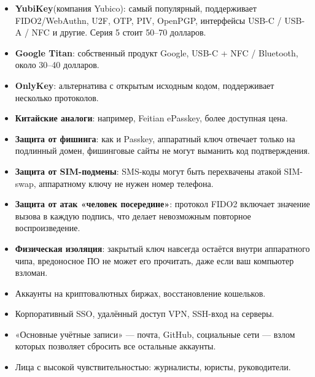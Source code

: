 \begin{itemize}
  \item \textbf{YubiKey}(компания Yubico): самый популярный, поддерживает FIDO2/WebAuthn, U2F, OTP, PIV, OpenPGP, интерфейсы USB-C / USB-A / NFC и другие. Серия 5 стоит 50–70 долларов.
  \item \textbf{Google Titan}: собственный продукт Google, USB-C + NFC / Bluetooth, около 30–40 долларов.
  \item \textbf{OnlyKey}: альтернатива с открытым исходным кодом, поддерживает несколько протоколов.
  \item \textbf{Китайские аналоги}: например, Feitian ePasskey, более доступная цена.
\end{itemize}


\begin{itemize}
  \item \textbf{Защита от фишинга}: как и Passkey, аппаратный ключ отвечает только на подлинный домен, фишинговые сайты не могут выманить код подтверждения.
  \item \textbf{Защита от SIM-подмены}: SMS-коды могут быть перехвачены атакой SIM-swap, аппаратному ключу не нужен номер телефона.
  \item \textbf{Защита от атак «человек посередине»}: протокол FIDO2 включает значение вызова в каждую подпись, что делает невозможным повторное воспроизведение.
  \item \textbf{Физическая изоляция}: закрытый ключ навсегда остаётся внутри аппаратного чипа, вредоносное ПО не может его прочитать, даже если ваш компьютер взломан.
\end{itemize}


\begin{itemize}
  \item Аккаунты на криптовалютных биржах, восстановление кошельков.
  \item Корпоративный SSO, удалённый доступ VPN, SSH-вход на серверы.
  \item «Основные учётные записи» — почта, GitHub, социальные сети — взлом которых позволяет сбросить все остальные аккаунты.
  \item Лица с высокой чувствительностью: журналисты, юристы, руководители.
\end{itemize}


